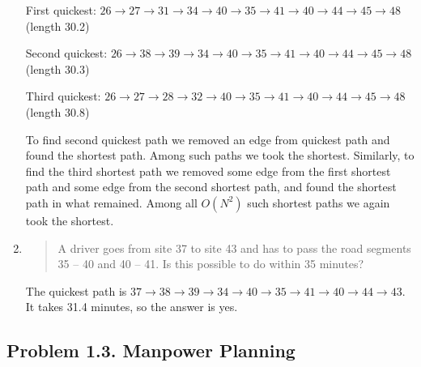 \begin{enumerate}[1.]
First quickest: $ 26 \rightarrow 27 \rightarrow 31 \rightarrow 34 \rightarrow 40 \rightarrow 35 \rightarrow 41 \rightarrow 40 \rightarrow 44 \rightarrow 45 \rightarrow 48 $  (length 30.2)

Second quickest: $ 26 \rightarrow 38 \rightarrow 39 \rightarrow 34 \rightarrow 40 \rightarrow 35 \rightarrow 41 \rightarrow 40 \rightarrow 44 \rightarrow 45 \rightarrow 48 $  (length 30.3)

Third quickest: $ 26 \rightarrow 27 \rightarrow 28 \rightarrow 32 \rightarrow 40 \rightarrow 35 \rightarrow 41 \rightarrow 40 \rightarrow 44 \rightarrow 45 \rightarrow 48 $  (length 30.8)

To find second quickest path we removed an edge from quickest path and found the shortest path. Among such paths we took the shortest. Similarly, to find the third shortest path we removed some edge from the first shortest path and some edge from the second shortest path, and found the shortest path in what remained. Among all $O(N^2)$ such shortest paths we again took the shortest.
\item
\begin{quote}
A driver goes from site 37 to site 43 and has to pass the road segments 35 – 40 and 40 – 41. Is this possible to do within 35 minutes?
\end{quote}

The quickest path is $ 37 \rightarrow 38 \rightarrow 39 \rightarrow 34 \rightarrow 40 \rightarrow 35 \rightarrow 41 \rightarrow 40 \rightarrow 44 \rightarrow 43 $. It takes 31.4 minutes, so the answer is yes.
\end{enumerate}

\subsection{Problem 1.3. Manpower Planning}

